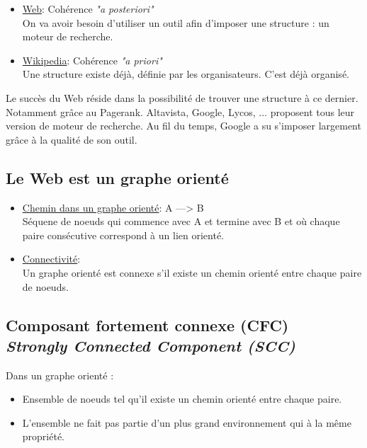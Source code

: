 \documentclass{article}
\begin{document}
\begin{itemize}
\item \underline{Web}: Cohérence \textit{"a posteriori"} \\
                       On va avoir besoin d'utiliser un outil afin d'imposer                         une structure : un moteur de recherche. 
      
\item \underline{Wikipedia}: Cohérence \textit{"a priori"} \\
                             Une structure existe déjà, définie par les                                    organisateurs. C'est déjà organisé.
\end{itemize}

Le succès du Web réside dans la possibilité de trouver une structure à ce dernier. Notamment grâce au Pagerank. Altavista, Google, Lycos, ... proposent tous leur version de moteur de recherche. Au fil du temps, Google a su s'imposer largement grâce à la qualité de son outil.

\subsection{Le Web est un graphe orienté}
\begin{itemize}
\item \underline{Chemin dans un graphe orienté}: A ---> B\\
Séquene de noeuds qui commence avec A et termine avec B et où chaque paire consécutive correspond à un lien orienté.

\item \underline{Connectivité}: \\
Un graphe orienté est connexe s'il existe un chemin orienté entre chaque paire de noeuds.
\end{itemize}

\subsection{Composant fortement connexe (CFC) \\ \textit{Strongly Connected Component (SCC)} }

Dans un graphe orienté :
\begin{itemize}
    \item Ensemble de noeuds tel qu'il existe un chemin orienté entre                   chaque paire.
    \item L'ensemble ne fait pas partie d'un plus grand environnement qui               à la même propriété. 
\end{itemize}
\end{document}
